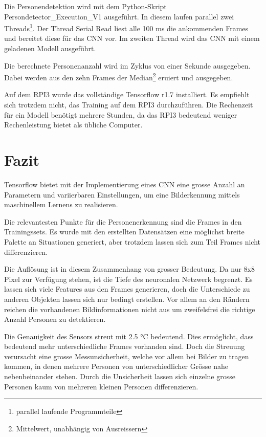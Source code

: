 Die Personendetektion wird mit dem Python-Skript Persondetector\_Execution\_V1 ausgeführt. In diesem laufen parallel zwei Threads\footnote[32]{parallel laufende Programmteile}. Der Thread Serial Read liest alle 100 ms die ankommenden Frames und bereitet diese für das \ac{CNN} vor. Im zweiten Thread wird das \ac{CNN} mit einem geladenen Modell ausgeführt. 

Die berechnete Personenanzahl wird im Zyklus von einer Sekunde ausgegeben. Dabei werden aus den zehn Frames der Median\footnote[33]{Mittelwert, unabhängig von Ausreissern} eruiert und ausgegeben. 

Auf dem \ac{RPI3} wurde das vollständige Tensorflow r1.7 installiert. Es empfiehlt sich trotzdem nicht, das Training auf dem \ac{RPI3} durchzuführen. Die Rechenzeit für ein Modell benötigt mehrere Stunden, da das \ac{RPI3} bedeutend weniger Rechenleistung bietet als übliche Computer. 

\section{Fazit}

Tensorflow bietet mit der Implementierung eines \ac{CNN} eine grosse Anzahl an Parametern und variierbaren Einstellungen, um eine Bilderkennung mittels maschinellem Lernens zu realisieren. 

Die relevantesten Punkte für die Personenerkennung sind die Frames in den Trainingssets. Es wurde mit den erstellten Datensätzen eine möglichst breite Palette an Situationen generiert, aber trotzdem lassen sich zum Teil Frames nicht differenzieren.

Die Auflösung ist in diesem Zusammenhang von grosser Bedeutung. Da nur 8x8 Pixel zur Verfügung stehen, ist die Tiefe des neuronalen Netzwerk begrenzt. Es lassen sich viele Features aus den Frames generieren, doch die Unterschiede zu anderen Objekten lassen sich nur bedingt erstellen. Vor allem an den Rändern reichen die vorhandenen Bildinformationen nicht aus um zweifelsfrei die richtige Anzahl Personen zu detektieren. 

Die Genauigkeit des Sensors streut mit 2.5 °C bedeutend. Dies ermöglicht, dass bedeutend mehr unterschiedliche Frames vorhanden sind. Doch die Streuung verursacht eine grosse Messunsicherheit, welche vor allem bei Bilder zu tragen kommen, in denen mehrere Personen von unterschiedlicher Grösse nahe nebenbeinander stehen. Durch die Unsicherheit lassen sich einzelne grosse Personen kaum von mehreren kleinen Personen differenzieren.






